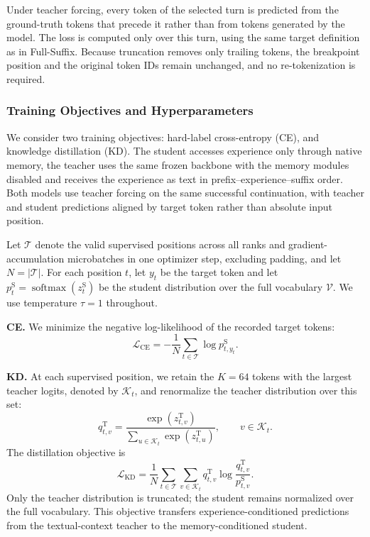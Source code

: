 Under teacher forcing, every token of the selected turn is predicted from
the ground-truth tokens that precede it rather than from tokens generated
by the model. The loss is computed only over this turn, using the same
target definition as in Full-Suffix. Because truncation removes only
trailing tokens, the breakpoint position and the original token IDs remain
unchanged, and no re-tokenization is required.

\subsubsection{Training Objectives and Hyperparameters}

We consider two training
objectives: hard-label cross-entropy (CE), 
and knowledge distillation (KD). The student accesses experience only through native memory, the teacher uses the same frozen backbone with the memory modules
disabled and receives the experience as text in
prefix--experience--suffix order. Both models use teacher forcing
on the same successful continuation, with teacher and student
predictions aligned by target token rather than absolute input
position.

Let $\mathcal{T}$ denote the valid supervised positions across all
ranks and gradient-accumulation microbatches in one optimizer step,
excluding padding, and let $N = |\mathcal{T}|$.
For each position $t$, let $y_t$ be the target token and let
$p_t^{\mathrm{S}} =
\operatorname{softmax}(z_t^{\mathrm{S}})$ be the student distribution
over the full vocabulary $\mathcal{V}$.
We use temperature $\tau=1$ throughout.

\textbf{CE.}
We minimize the negative log-likelihood of the recorded target tokens:
\[
\mathcal{L}_{\mathrm{CE}}
= -\frac{1}{N}
  \sum_{t\in\mathcal{T}}
  \log p_{t,y_t}^{\mathrm{S}}.
\]

\textbf{KD.}
At each supervised position, we retain the $K=64$ tokens with the
largest teacher logits, denoted by $\mathcal{K}_t$, and renormalize
the teacher distribution over this set:
\[
q_{t,v}^{\mathrm{T}}
=
\frac{\exp(z_{t,v}^{\mathrm{T}})}
     {\sum_{u\in\mathcal{K}_t}\exp(z_{t,u}^{\mathrm{T}})},
\qquad v\in\mathcal{K}_t.
\]
The distillation objective is
\[
\mathcal{L}_{\mathrm{KD}}
=
\frac{1}{N}
\sum_{t\in\mathcal{T}}
\sum_{v\in\mathcal{K}_t}
q_{t,v}^{\mathrm{T}}
\log
\frac{q_{t,v}^{\mathrm{T}}}
     {p_{t,v}^{\mathrm{S}}}.
\]
Only the teacher distribution is truncated; the student remains
normalized over the full vocabulary. This objective transfers
experience-conditioned predictions from the textual-context
teacher to the memory-conditioned student.

